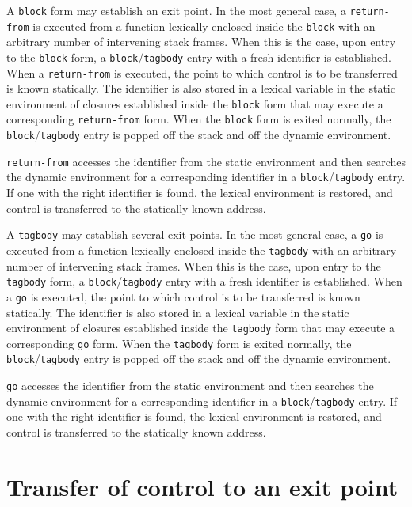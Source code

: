 A \texttt{block} form may establish an exit point.  In the most
general case, a \texttt{return-from} is executed from a function
lexically-enclosed inside the \texttt{block} with an arbitrary number
of intervening stack frames.  When this is the case, upon entry to the
\texttt{block} form, a \texttt{block}/\texttt{tagbody} entry with a
fresh identifier is established.  When a \texttt{return-from} is
executed, the point to which control is to be transferred is known
statically.  The identifier is also stored in a lexical variable in
the static environment of closures established inside the
\texttt{block} form that may execute a corresponding
\texttt{return-from} form.  When the \texttt{block} form is exited normally, the
\texttt{block}/\texttt{tagbody} entry is popped off the stack and off
the dynamic environment.

\texttt{return-from} accesses the identifier from the static
environment and then searches the dynamic environment for a
corresponding identifier in a \texttt{block}/\texttt{tagbody} entry.
If one with the right identifier is found, the lexical environment is
restored, and control is transferred to the statically known address.

A \texttt{tagbody} may establish several exit points.  In the most
general case, a \texttt{go} is executed from a function
lexically-enclosed inside the \texttt{tagbody} with an arbitrary
number of intervening stack frames.  When this is the case, upon entry
to the \texttt{tagbody} form, a \texttt{block}/\texttt{tagbody} entry
with a fresh identifier is established.  When a \texttt{go} is
executed, the point to which control is to be transferred is known
statically.  The identifier is also stored in a lexical variable in
the static environment of closures established inside the
\texttt{tagbody} form that may execute a corresponding \texttt{go}
form.  When the \texttt{tagbody} form is exited normally, the
\texttt{block}/\texttt{tagbody} entry is popped off the stack and off
the dynamic environment.

\texttt{go} accesses the identifier from the static environment and
then searches the dynamic environment for a corresponding identifier
in a \texttt{block}/\texttt{tagbody} entry.  If one with the right
identifier is found, the lexical environment is restored, and control
is transferred to the statically known address.

\section{Transfer of control to an exit point}

